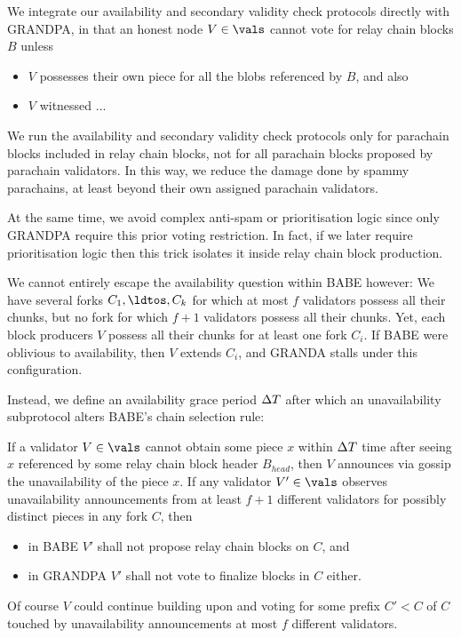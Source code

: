 We integrate our availability and secondary validity check protocols directly with GRANDPA, in that an honest node $V \in \vals$ cannot vote for relay chain blocks $B$ unless
\begin{itemize}
\item $V$ possesses their own piece for all the blobs referenced by $B$, and also
\item $V$ witnessed ...
\end{itemize}

We run the availability and secondary validity check protocols only for parachain blocks included in relay chain blocks, not for all parachain blocks proposed by parachain validators.  In this way, we reduce the damage done by spammy parachains, at least beyond their own assigned parachain validators.

At the same time, we avoid complex anti-spam or prioritisation logic since only GRANDPA require this prior voting restriction.  In fact, if we later require prioritisation logic then this trick isolates it inside relay chain block production.

We cannot entirely escape the availability question within BABE however:  We have several forks $C_1,\ldtos,C_k$ for which at most $f$ validators possess all their chunks, but no fork for which $f+1$ validators possess all their chunks.  Yet, each block producers $V$ possess all their chunks for at least one fork $C_i$.  If BABE were oblivious to availability, then $V$ extends $C_i$, and GRANDA stalls under this configuration. 

Instead, we define an availability grace period $\Delta T$ after which an unavailability subprotocol alters BABE's chain selection rule:  

If a validator $V \in \vals$ cannot obtain some piece $x$ within $\Delta T$ time after seeing $x$ referenced by some relay chain block header $B_{head}$, then $V$ announces via gossip the unavailability of the piece $x$.  
If any validator $V' \in \vals$ observes unavailability announcements from at least $f+1$ different validators for possibly distinct pieces in any fork $C$, then
\begin{itemize}
\item in BABE $V'$ shall not propose relay chain blocks on $C$, and
\item in GRANDPA $V'$ shall not vote to finalize blocks in $C$ either.
\end{itemize}
Of course $V$ could continue building upon and voting for some prefix $C' < C$ of $C$ touched by unavailability announcements at most $f$ different validators.


